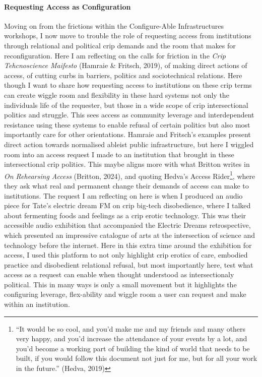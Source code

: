 \hypertarget{requesting-access-as-configuration}{%
\paragraph{Requesting Access as
Configuration}\label{requesting-access-as-configuration}}

Moving on from the frictions within the Configure-Able Infrastructures
workshops, I now move to trouble the role of requesting access from
institutions through relational and political crip demands and the room
that makes for reconfiguration. Here I am reflecting on the calls for
friction in the \emph{Crip Tehcnoscience Maifesto} (Hamraie \& Fritsch,
2019), of making direct actions of access, of cutting curbs in barriers,
politics and sociotechnical relations. Here though I want to share how
requesting access to institutions on these crip terms can create wiggle
room and flexibility in these hard systems not only the individuals life
of the requester, but those in a wide scope of crip intersectional
politics and struggle. This sees access as community leverage and
interdependent resistance using these systems to enable refusal of
certain politics but also most importantly care for other orientations.
Hamraie and Fritsch's examples present direct action towards normalised
ableist public infrastructure, but here I wiggled room into an access
request I made to an institution that brought in these intersectional
crip politics. This maybe aligns more with what Britton writes in
\emph{On Rehearsing Access} (Britton, 2024), and quoting Hedva's Access
Rider\footnote{``It would be so cool, and you'd make me and my friends
  and many others very happy, and you'd increase the attendance of your
  events by a lot, and you'd become a working part of building the kind
  of world that needs to be built, if you would follow this document not
  just for me, but for all your work in the future.'' (Hedva, 2019)},
where they ask what real and permanent change their demands of access
can make to institutions. The request I am reflecting on here is when I
produced an audio piece for Tate's electric dream FM on crip big-tech
disobedience, where I talked about fermenting foods and feelings as a
crip erotic technology. This was their accessible audio exhibition that
accompanied the Electric Dreams retrospective, which presented an
impressive catalogue of arts at the intersection of science and
technology before the internet. Here in this extra time around the
exhibition for access, I used this platform to not only highlight crip
erotics of care, embodied practice and disobedient relational refusal,
but most importantly here, test what access as a request can enable when
thought understood as intersectionaly political. This in many ways is
only a small movement but it highlights the configuring leverage,
flex-ability and wiggle room a user can request and make within an
institution.

